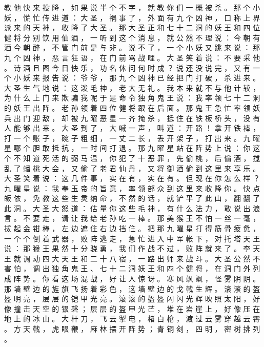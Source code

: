 {教 他 快 来 投 降 ， 如 果 说 半 个 不 字 ， 就 教 你 们 一 概 被 杀 。
那 个 小 妖 ， 慌 忙 传 进 道 ： 大 圣 ， 祸 事 了 ， 外 面 有 九 个 凶 神 ， 口 称 上 界 派 来 的 天 神 ， 收 降 了 大 圣 。
那 大 圣 正 和 七 十 二 洞 的 妖 王 和 四 位 健 将 分 别 饮 用 仙 酒 ， 一 听 到 这 个 消 息 ， 就 公 然 不 理 说 ： 今 朝 有 酒 今 朝 醉 ， 不 管 门 前 是 与 非 。
说 不 了 ， 一 个 小 妖 又 跳 来 说 ： 那 九 个 凶 神 ， 恶 言 狂 语 ， 在 门 前 骂 战 哩 。
大 圣 笑 着 说 ： 不 要 采 他 。
诗 酒 且 图 今 日 快 乐 ， 功 名 休 问 何 时 成 ？
说 还 没 说 完 ， 又 有 一 个 小 妖 来 报 告 说 ： 爷 爷 ， 那 九 个 凶 神 已 经 把 门 打 破 ， 杀 进 来 。
大 圣 生 气 地 说 ： 这 泼 毛 神 ， 老 大 无 礼 。
我 本 来 就 不 与 他 计 较 ， 为 什 么 上 门 来 欺 骗 我 呢 于 是 命 令 独 角 鬼 王 说 ： 我 率 领 七 十 二 洞 的 妖 王 出 阵 。
老 孙 领 着 四 位 健 将 跟 在 后 面 。
那 鬼 王 急 忙 率 领 妖 兵 出 门 迎 敌 ， 却 被 九 曜 恶 星 一 齐 掩 杀 ， 抵 住 在 铁 板 桥 头 ， 没 有 人 能 够 出 来 。
大 圣 到 了 ， 大 喊 一 声 ， 叫 道 ： 开 路 ！ 拿 开 铁 棒 ， 打 一 个 账 子 ， 碗 子 粗 细 ， 一 丈 二 长 ， 丢 开 架 子 ， 打 出 来 。
九 曜 星 哪 个 胆 敢 抵 抗 ， 一 时 间 打 退 。
那 九 曜 星 站 在 阵 势 上 说 ： 你 这 个 不 知 道 死 活 的 弼 马 温 ， 你 犯 了 十 恶 罪 ， 先 偷 桃 ， 后 偷 酒 ， 搅 乱 了 蟠 桃 大 会 ， 又 偷 了 老 君 仙 丹 ， 又 将 御 酒 偷 到 这 里 来 享 乐 。
大 圣 笑 着 说 ： 这 几 件 事 ， 实 在 有 ， 实 在 有 。
但 现 在 你 怎 么 样 ？ 九 曜 星 说 ： 我 奉 玉 帝 的 旨 意 ， 率 领 部 众 到 这 里 来 收 降 你 。
快 点 皈 依 ， 免 教 这 些 生 灵 纳 命 ， 不 然 的 话 ， 就 铲 平 了 此 山 ， 翻 翻 了 此 洞 。
大 圣 大 怒 道 ： 估 量 你 这 些 毛 神 ， 有 什 么 法 力 ， 敢 说 出 浪 言 。
不 要 走 ， 请 让 我 给 老 孙 吃 一 棒 。
那 美 猴 王 不 怕 一 丝 一 毫 ， 拔 起 金 钳 棒 ， 左 边 遮 住 右 边 挡 住 。
把 那 九 曜 星 打 得 筋 骨 疲 惫 ， 一 个 个 倒 着 武 器 ， 败 阵 逃 走 ， 急 忙 进 入 中 军 帐 下 ， 对 托 塔 天 王 说 ： 那 猴 王 果 然 十 分 骁 勇 ， 我 们 作 战 不 过 ， 败 阵 就 来 了 。
李 天 王 就 调 动 四 大 天 王 和 二 十 八 宿 ， 一 路 出 师 来 战 斗 。
大 圣 公 然 不 害 怕 ， 调 出 独 角 鬼 王 、 七 十 二 洞 妖 王 和 四 个 健 将 ， 在 洞 门 外 列 成 阵 势 。
你 看 这 场 混 战 ， 好 让 人 惊 讶 。 寒 风 飒 飒 ， 怪 雾 阴 阴 。
那 墙 壁 边 的 旌 旗 飞 扬 着 彩 色 ， 这 墙 壁 边 的 戈 戟 生 辉 。
滚 滚 的 盔 盔 明 亮 ， 层 层 的 铠 甲 光 亮 。
滚 滚 的 盔 盔 闪 闪 光 辉 映 照 太 阳 ， 好 像 撞 击 天 空 的 银 磬 ； 层 层 的 盔 甲 光 芒 ， 堆 在 岩 崖 上 ， 好 像 压 在 地 上 的 冰 山 。
大 杆 刀 ， 飞 云 掣 电 ， 楮 白 枪 ， 渡 过 云 雾 穿 越 云 霄 。
方 天 戟 ， 虎 眼 鞭 ， 麻 林 摆 开 阵 势 ； 青 铜 剑 ， 四 明 ， 密 树 排 列 。
}
